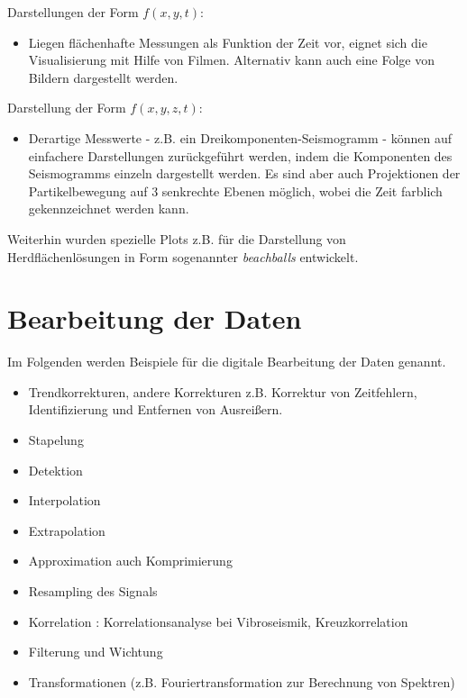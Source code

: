 \noindent Darstellungen der Form $f(x,y,t)$: \begin{itemize}
\item Liegen flächenhafte Messungen als Funktion der Zeit vor, eignet sich die Visualisierung mit Hilfe von Filmen. Alternativ kann auch eine Folge von Bildern dargestellt werden.  
  \end{itemize}
  
\noindent Darstellung der Form $f(x,y,z,t)$:
\begin{itemize}
\item Derartige Messwerte - z.B. ein Dreikomponenten-Seismogramm - können auf einfachere Darstellungen zurückgeführt werden, indem die Komponenten des Seismogramms einzeln dargestellt werden. Es sind aber auch Projektionen der Partikelbewegung auf 3 senkrechte Ebenen möglich, wobei die Zeit farblich gekennzeichnet werden kann.
\end{itemize}
Weiterhin wurden spezielle Plots z.B. für die Darstellung von Herdflächenlösungen in Form sogenannter \textit{beachballs} entwickelt. 

\section{Bearbeitung der Daten}
Im Folgenden werden Beispiele für die digitale Bearbeitung der Daten genannt.
\begin{itemize}
\item Trendkorrekturen, andere Korrekturen z.B. Korrektur von Zeitfehlern, Identifizierung und Entfernen von Ausreißern. 
\item Stapelung
\item Detektion
\item Interpolation
\item Extrapolation
\item Approximation auch Komprimierung
\item Resampling des Signals
\item Korrelation : Korrelationsanalyse bei Vibroseismik, Kreuzkorrelation
\item Filterung und Wichtung
\item Transformationen (z.B. Fouriertransformation zur Berechnung von Spektren)
  \end{itemize}

